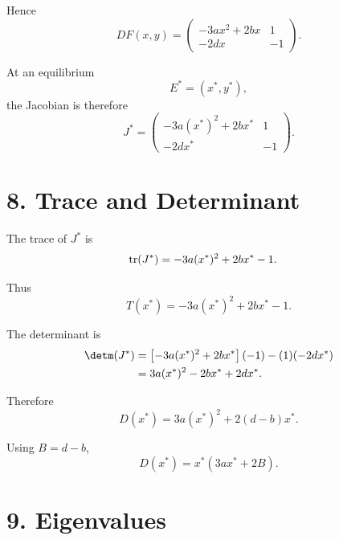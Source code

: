 \documentclass[11pt,a4paper]{article}
\begin{document}
Hence
\begin{equation}
\boxed{
DF(x,y)
=
\begin{pmatrix}
-3ax^2+2bx&1\\
-2dx&-1
\end{pmatrix}.
}
\tag{29}
\end{equation}

At an equilibrium
\begin{equation}
E^*=(x^*,y^*),
\end{equation}
the Jacobian is therefore
\begin{equation}
\boxed{
J^*
=
\begin{pmatrix}
-3a(x^*)^2+2bx^*&1\\
-2dx^*&-1
\end{pmatrix}.
}
\tag{30}
\end{equation}

\section{8. Trace and Determinant}

The trace of $J^*$ is
\begin{align}
\tr(J^*)
&=
-3a(x^*)^2+2bx^*-1.
\end{align}

Thus
\begin{equation}
\boxed{
T(x^*)
=
-3a(x^*)^2+2bx^*-1.
}
\tag{31}
\end{equation}

The determinant is
\begin{align}
\detm(J^*)
&=
\left[-3a(x^*)^2+2bx^*\right](-1)
-
(1)(-2dx^*)\\
&=
3a(x^*)^2-2bx^*+2dx^*.
\end{align}

Therefore
\begin{equation}
\boxed{
D(x^*)
=
3a(x^*)^2+2(d-b)x^*.
}
\tag{32}
\end{equation}

Using $B=d-b$,
\begin{equation}
\boxed{
D(x^*)
=
x^*\left(3ax^*+2B\right).
}
\tag{33}
\end{equation}

\section{9. Eigenvalues}
\end{document}
